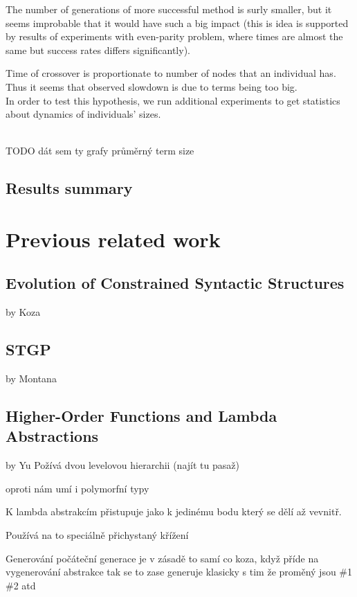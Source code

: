 \documentclass[12pt,a4paper]{report}
\begin{document}
The number of generations of more successful method is surly smaller,
but it seems improbable that it would have such a big impact 
(this is idea is supported by results of experiments with
even-parity problem, where times are almost the same but success 
rates differs significantly). 

Time of crossover is proportionate to number of nodes that 
an individual has. Thus it seems that observed slowdown is
due to terms being too big. \\

In order to test this hypothesis, we run additional experiments
to get statistics about dynamics of individuals' sizes. 


~\\TODO dát sem ty grafy průměrný term size 

\section{Results summary}


		
\chapter{Previous related work}

\section{Evolution of Constrained Syntactic Structures }
by Koza

\section{STGP}
by Montana

\section{Higher-Order Functions and Lambda Abstractions} 
by Yu
Požívá dvou levelovou hierarchii (najít tu pasaž)

oproti nám umí i polymorfní typy

K  lambda abstrakcím přistupuje jako k jedinému bodu který se dělí až 
vevnitř.

Používá na to speciálně přichystaný křížení

Generování počáteční generace je v zásadě to samí co koza, když příde na vygenerování 
abstrakce tak se to zase generuje klasicky s tim že proměný jsou \#1 \#2 atd
\end{document}
